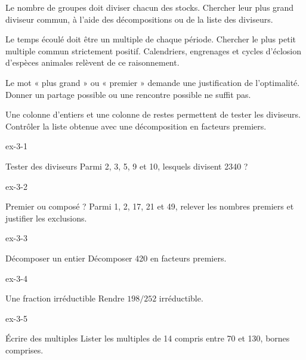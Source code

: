 \begin{savoirfaire}Le nombre de groupes doit diviser chacun des stocks. Chercher leur plus grand diviseur commun, à l’aide des décompositions ou de la liste des diviseurs.\end{savoirfaire}
\begin{savoirfaire}Le temps écoulé doit être un multiple de chaque période. Chercher le plus petit multiple commun strictement positif. Calendriers, engrenages et cycles d’éclosion d’espèces animales relèvent de ce raisonnement.\end{savoirfaire}
\begin{attention}Le mot « plus grand » ou « premier » demande une justification de l’optimalité. Donner un partage possible ou une rencontre possible ne suffit pas.\end{attention}
Une colonne d’entiers et une colonne de restes permettent de tester les diviseurs. Contrôler la liste obtenue avec une décomposition en facteurs premiers.
\clearpage{}
\begin{blocLivre}{ex-3-1}\begin{exercice}[1]{Tester des diviseurs}
Parmi 2, 3, 5, 9 et 10, lesquels divisent 2340 ?
\end{exercice}\end{blocLivre}
\begin{blocLivre}{ex-3-2}\begin{exercice}[1]{Premier ou composé ?}
Parmi 1, 2, 17, 21 et 49, relever les nombres premiers et justifier les exclusions.
\end{exercice}\end{blocLivre}
\begin{blocLivre}{ex-3-3}\begin{exercice}[1]{Décomposer un entier}
Décomposer 420 en facteurs premiers.
\end{exercice}\end{blocLivre}
\begin{blocLivre}{ex-3-4}\begin{exercice}[1]{Une fraction irréductible}
Rendre $198/252$ irréductible.
\end{exercice}\end{blocLivre}
\begin{blocLivre}{ex-3-5}\begin{exercice}[1]{Écrire des multiples}
Lister les multiples de 14 compris entre 70 et 130, bornes comprises.
\end{exercice}\end{blocLivre}


